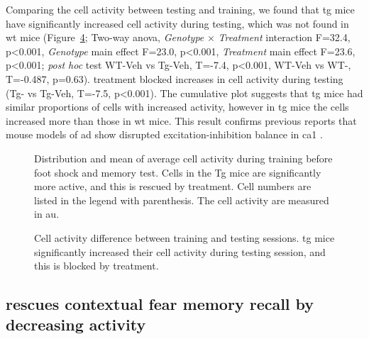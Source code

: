 Comparing the cell activity between testing and training, we found that \gls{tg} mice have significantly increased cell activity during testing,  which was not found in \gls{wt} mice (Figure~\ref{f.ad.actdiff}; Two-way \gls{anova}, \textit{Genotype} $\times$ \textit{Treatment} interaction F=32.4, p<0.001, \textit{Genotype} main effect F=23.0, p<0.001, \textit{Treatment} main effect F=23.6, p<0.001; \textit{post hoc} test WT-Veh vs Tg-Veh, T=-7.4, p<0.001, WT-Veh vs WT-\glu, T=-0.487, p=0.63). \tglu{} treatment blocked increases in cell activity during testing (Tg-\glu{} vs Tg-Veh, T=-7.5, p<0.001). The cumulative plot suggests that \gls{tg} mice had similar proportions of cells with increased activity, however in \gls{tg} mice the cells increased more than those in \gls{wt} mice. This result confirms previous reports that mouse models of \gls{ad} show disrupted excitation-inhibition balance in \gls{ca1} \citep{palop16}.


\begin{figure}[h]
    \begin{subfigure}[h]{0.9\textwidth}
        
        \caption{\label{f.ad.acttrain}}
    \end{subfigure}
    \begin{subfigure}[h]{0.9\textwidth}
        
        \caption{\label{f.ad.acttest}}
    \end{subfigure}
    \caption[Cell activity during training and memory test.]{Distribution and mean of average cell activity during  training before foot shock and  memory test. Cells in the Tg mice are significantly more active, and this is rescued by \tglu{} treatment. Cell numbers are listed in the legend with parenthesis. The cell activity are measured in \gls{au}. \label{f.ad.activity}}
\end{figure}

\begin{figure}[h]
    
    \caption[Cell activity difference between training and memory test.]{Cell activity difference between training and testing sessions. \gls{tg} mice significantly increased their cell activity during testing session, and this is blocked by \tglu{} treatment. \label{f.ad.actdiff}}
\end{figure}


\subsection{\tglu{} rescues contextual fear memory recall by decreasing activity}

